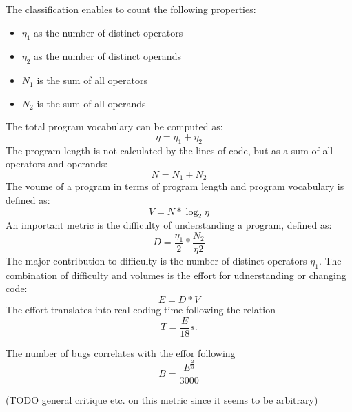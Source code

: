 The classification enables to count the following properties:
\begin{itemize}
    \item $\eta_1$ as the number of distinct operators 
    \item $\eta_2$ as the number of distinct operands
    \item $N_1$ is the sum of all operators
    \item $N_2$ is the sum of all operands  
\end{itemize}
The total program vocabulary can be computed as:
\begin{displaymath}
    \eta = \eta_1 + \eta_2
\end{displaymath}
The program length is not calculated by the lines of code, but as a sum of all operators and operands:
\begin{displaymath}
    N = N_1 + N_2
\end{displaymath}
The voume of a program in terms of program length and program vocabulary is defined as: 
\begin{displaymath}
    V = N * \log_2{\eta}
\end{displaymath}
An important metric is the difficulty of understanding a program, defined as:
\begin{displaymath}
    D = \frac{\eta_1}{2} * \frac{N_2}{\eta2}
\end{displaymath}
The major contribution to difficulty is the number of distinct operators $\eta_1$.
The combination of difficulty and volumes is the effort for udnerstanding or changing code:
\begin{displaymath}
    E = D * V
\end{displaymath}
The effort translates into real coding time following the relation
\begin{displaymath}
    T = \frac{E}{18}s.
\end{displaymath}

The number of  bugs correlates with the effor following
\begin{displaymath}
    B = \frac{E^{\frac{2}{3}}}{3000}
\end{displaymath}

(TODO general critique etc. on this metric since it seems to be arbitrary)

